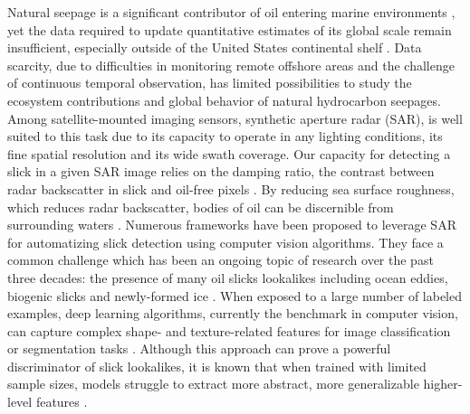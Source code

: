 \documentclass[journal]{IEEEtran}
\begin{document}
Natural seepage is a significant contributor of oil entering marine environments \cite{kvenvoldenNaturalSeepageCrude2003}, yet the data required to update quantitative
estimates of its global scale remain insufficient, especially outside of the United States continental shelf \cite{nationalacademiesofsciencesengineeringandmedicineOilSeaIV2022}. Data scarcity, 
due to difficulties in monitoring remote offshore areas and the challenge of continuous temporal observation, has limited possibilities to study the ecosystem contributions 
and global behavior of natural hydrocarbon seepages. Among satellite-mounted imaging sensors, synthetic aperture radar (SAR), is well suited to this task due to its capacity to operate in any lighting conditions, 
its fine spatial resolution and its wide swath coverage. Our capacity for detecting a slick in a given SAR image relies on the damping ratio, the contrast between radar backscatter in slick and oil-free pixels 
\cite{hovlandSlickDetectionSAR1994,quigleyInvestigationDampingRatio2023}. By reducing sea surface roughness, which reduces radar backscatter, bodies of oil can be discernible from surrounding waters \cite{brekkeSAROilSpill2020,fingasReviewOilSpill2018,alpersOilsSurfactants2004}. 
Numerous frameworks have been proposed to leverage SAR for automatizing slick detection using computer vision algorithms.
They face a common challenge which has been an ongoing topic of research over the past three decades: the presence of many oil slicks lookalikes including ocean eddies, biogenic slicks and newly-formed ice
\cite{johanssonCanMineralOil2020,hovlandSlickDetectionSAR1994,alpersOilsSurfactants2004,alpersOilSpillDetection2017,espedalSatelliteDetectionNatural1996}. When exposed to a large number of labeled examples, 
deep learning algorithms, currently the benchmark in computer vision, can capture complex shape- and texture-related features for image classification or segmentation tasks \cite{goodfellowDeepLearning2016}. 
Although this approach can prove a powerful discriminator of slick lookalikes, it is known that when trained with limited sample sizes, models struggle to extract more abstract, more generalizable 
higher-level features \cite{bengioDeepLearnersBenefit2011,bengioDeepLearningRepresentations2012}. 
\end{document}
